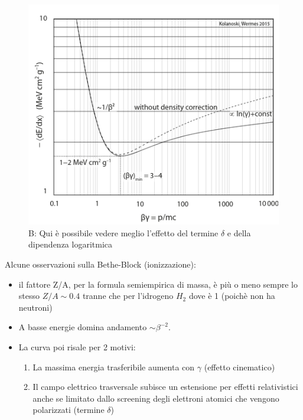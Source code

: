 \begin{minipage}{0.48\textwidth}

\begin{figure}[H]
    \centering
    \includegraphics[width=\textwidth,frame]{Chapters/images/Interazione_radiazione_materia/image-20220214175429234.png}
    \captionsetup{width=\textwidth}
    \caption{B: Qui è possibile vedere meglio l'effetto del termine $\delta$ e della dipendenza logaritmica}
    \label{fig:}
\end{figure}

\end{minipage}
Alcune osservazioni sulla Bethe-Block (ionizzazione):
\begin{itemize}
    \item il fattore Z/A, per la formula semiempirica di massa, è più o meno sempre lo stesso $Z/A\sim 0.4$ tranne che per l'idrogeno $H_2$ dove è 1 (poichè non ha neutroni)
    \item A basse energie domina andamento $\sim \beta^{-2}$.
    \item La curva poi risale per 2 motivi:
    \begin{enumerate}
        \item La massima energia trasferibile aumenta con $ \gamma$ (effetto cinematico)
        \item Il campo elettrico trasversale subisce un estensione per effetti relativistici anche se limitato dallo screening degli elettroni atomici che vengono polarizzati (termine $\delta$)
    \end{enumerate}
\end{itemize}

